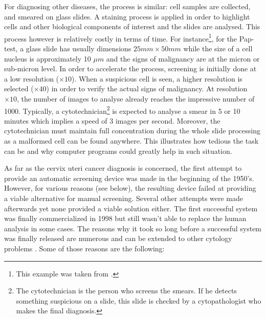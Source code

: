For diagnosing other diseases, the process is similar: cell samples are collected, and smeared on glass slides. A staining process is applied in order to highlight cells and other biological components of interest and the slides are analysed. This process however is relatively costly in terms of time. For instance\footnote{This example was taken from \cite{bengtsson2014screening}.}, for the Pap-test, a glass slide has usually dimensions $25mm \times 50mm$ while the size of a cell nucleus is approximately 10 $\mu m$ and the signs of malignancy are at the micron or sub-micron level. In order to accelerate the process, screening is initially done at a low resolution ($\times 10$). When a suspicious cell is seen, a higher resolution is selected ($\times 40$) in order to verify the actual signs of malignancy. 
At resolution $\times 10$, the number of images to analyse already reaches the impressive number of 1000. Typically, a cytotechnician\footnote{The cytotechnician is the person who screens the smears. If he detects something suspicious on a slide, this slide is checked by a cytopathologist who makes the final diagnosis.} is expected to analyse a smear in 5 or 10 minutes which implies a speed of 3 images per second. Moreover, the cytotechnician must maintain full concentration during the whole slide processing as a malformed cell can be found anywhere. This illustrates how tedious the task can be and why computer programs could greatly help in such situation. 

As far as the cervix uteri cancer diagnosis is concerned, the first attempt to provide an automatic screening device was made in the beginning of the 1950's. However, for various reasons (see below), the resulting device failed at providing a viable alternative for manual screening. Several other attempts were made afterwards yet none provided a viable solution either. The first successful system was finally commercialized in 1998 but still wasn't able to replace the human analysis in some cases. The reasons why it took so long before a successful system was finally released are numerous and can be extended to other cytology problems \cite{bengtsson2014screening}. Some of those reasons are the following:

